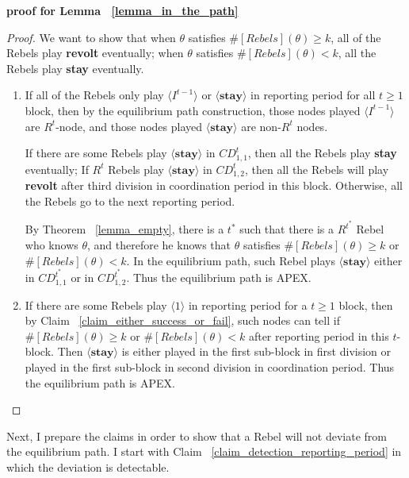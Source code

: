 \documentclass[12pt,letterpaper]{article}
\newtheorem*{main result}{Main Result}
\theoremstyle{definition}
\theoremstyle{remark}
\theoremstyle{claim}
\begin{document}
\noindent \textbf{proof for Lemma ~\ref{lemma_in_the_path}}
\begin{proof}
We want to show that when $\theta$ satisfies $\#[Rebels](\theta)\geq k$, all of the Rebels play \textbf{revolt} eventually; when $\theta$ satisfies $\#[Rebels](\theta)< k$, all the Rebels play \textbf{stay} eventually.
\begin{enumerate}
\item If all of the Rebels only play $\langle I^{t-1} \rangle$ or $\langle \textbf{stay} \rangle$ in reporting period for all $t\geq 1$ block, then by the equilibrium path construction, those nodes played $\langle I^{t-1} \rangle$ are $R^t$-node, and those nodes played $\langle \textbf{stay} \rangle$ are non-$R^t$ nodes. 

If there are some Rebels play $\langle \textbf{stay} \rangle$ in $CD^t_{1,1}$, then all the Rebels play \textbf{stay} eventually; If $R^t$ Rebels play $\langle \textbf{stay} \rangle$ in $CD^t_{1,2}$, then all the Rebels will play \textbf{revolt} after third division in coordination period in this block. Otherwise, all the Rebels go to the next reporting period.

By Theorem ~\ref{lemma_empty}, there is a $t^{*}$ such that there is a $R^{t^{*}}$ Rebel who knows $\theta$, and therefore he knows that $\theta$ satisfies $\#[Rebels](\theta)\geq k$ or $\#[Rebels](\theta)< k$. In the equilibrium path, such Rebel plays $\langle \textbf{stay} \rangle$ either in $CD^{t^{*}}_{1,1}$ or in $CD^{t^{*}}_{1,2}$. Thus the equilibrium path is APEX.

\item If there are some Rebels play $\langle 1 \rangle$ in reporting period for a $t\geq 1$ block, then by Claim ~\ref{claim_either_success_or_fail}, such nodes can tell if $\#[Rebels](\theta)\geq k$ or $\#[Rebels](\theta)< k$ after reporting period in this $t$-block. Then $\langle \textbf{stay} \rangle$ is either played in the first sub-block in first division or played in the first sub-block in second division in coordination period. Thus the equilibrium path is APEX.

 
\end{enumerate}

\end{proof}



Next, I prepare the claims in order to show that a Rebel will not deviate from the equilibrium path. I start with Claim ~\ref{claim_detection_reporting_period} in which the deviation is detectable.
\end{document}
